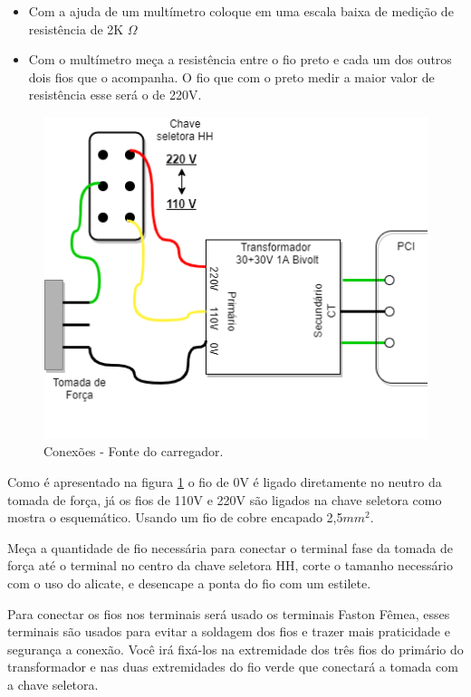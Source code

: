 \begin{itemize}
    \item Com a ajuda de um multímetro coloque em uma escala baixa de medição de resistência de 2K $\Omega$ 
    \item Com o multímetro meça a resistência entre o fio preto e cada um dos outros dois fios que o acompanha. O fio que com o preto medir a maior valor de resistência esse será o de 220V.
\end{itemize}


\begin{figure}[H]
  \centering
  \includegraphics[width=\textwidth]{Figuras/Carregador/conexao_carregador.png}
  \caption{Conexões - Fonte do carregador.} 
  \label{carregador_conexoes}
\end{figure}

Como é apresentado na figura \ref{carregador_conexoes} o fio de 0V é ligado diretamente no neutro da tomada de força, já os fios de 110V e 220V são ligados na chave seletora como mostra o esquemático. Usando um fio de cobre encapado 2,5$mm^2$.

Meça a quantidade de fio necessária para conectar o terminal fase da tomada de força até o terminal no centro da chave seletora HH, corte o tamanho necessário com o uso do alicate, e desencape a ponta do fio com um estilete.

Para conectar os fios nos terminais será usado os terminais Faston Fêmea, esses terminais são usados para evitar a soldagem dos fios e trazer mais praticidade e segurança a conexão. Você irá fixá-los na extremidade dos três fios do primário do transformador e nas duas extremidades do fio verde que conectará a tomada com a chave seletora.

